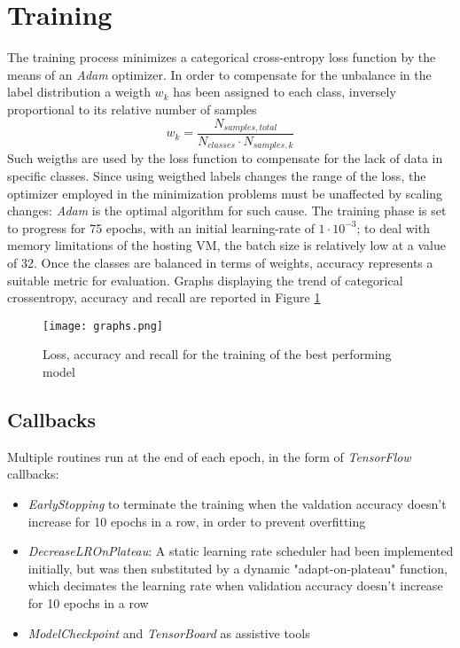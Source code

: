 \documentclass[conference]{IEEEtran}
\begin{document}
\section{Training}
The training process minimizes a categorical cross-entropy loss function by the
means of an \textit{Adam} optimizer. In order to compensate for the unbalance in
the label distribution a weigth $w_k$ has been assigned to each class, inversely
proportional to its relative number of samples
\begin{equation}
    w_k = \frac{N_{samples,total}}{N_{classes}\cdot N_{samples,k}}
\end{equation} 
Such weigths are used
by the loss function to compensate for the lack of data in specific classes.
Since using weigthed labels changes the range of the loss, the optimizer
employed in the minimization problems must be unaffected by scaling changes:
\textit{Adam} is the optimal algorithm for such cause. The training phase is set
to progress for 75 epochs, with an initial learning-rate of $1\cdot 10^{-3}$; to
deal with memory limitations of the hosting VM, the batch size is relatively low
at a value of 32. Once the classes are balanced in terms of weights,
accuracy represents a suitable metric for evaluation. Graphs displaying the
trend of categorical crossentropy, accuracy and recall are reported in Figure
\ref{fig:graphs}
\begin{figure}[]
    \texttt{[image: graphs.png]}
    \caption{Loss, accuracy and recall for the training of the best performing model}
    \label{fig:graphs}
\end{figure}
\subsection{Callbacks}
Multiple routines run at the end of each epoch, in the form of
\textit{TensorFlow} callbacks: 
\begin{itemize}
    \item \textit{EarlyStopping} to terminate the training when the
    valdation accuracy doesn't increase for 10 epochs in a row, in order to
    prevent overfitting
    \item \textit{DecreaseLROnPlateau}: A static learning rate scheduler had
    been implemented initially, but
    was then substituted by a dynamic "adapt-on-plateau" function, which
    decimates the learning rate when validation accuracy doesn't increase for 10
    epochs in a row
    \item \textit{ModelCheckpoint} and \textit{TensorBoard} as assistive tools
\end{itemize}
\end{document}
